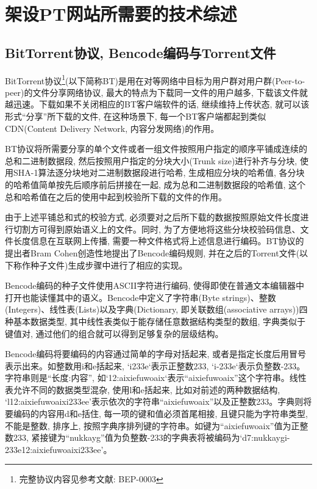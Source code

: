 \chapter{架设PT网站所需要的技术综述}

\section{BitTorrent协议, Bencode编码与Torrent文件}
\label{sec:BitorrentProtocol}

BitTorrent协议\footnote{完整协议内容见参考文献: BEP-0003\cite{bramcohen2008bep0003}}(以下简称BT)是用在对等网络中目标为用户群对用户群(Peer-to-peer)的文件分享网络协议, 最大的特点为下载同一文件的用户越多, 下载该文件就越迅速。下载如果不关闭相应的BT客户端软件的话, 继续维持上传状态, 就可以该形式``分享''所下载的文件, 在这种场景下, 每一个BT客户端都起到类似CDN(Content Delivery Network, 内容分发网络)的作用。

BT协议将所需要分享的单个文件或者一组文件按照用户指定的顺序平铺成连续的总和二进制数据段, 然后按照用户指定的分块大小(Trunk size)进行补齐与分块, 使用SHA-1算法逐分块地对二进制数据段进行哈希, 生成相应分块的哈希值, 各分块的哈希值简单按先后顺序前后拼接在一起, 成为总和二进制数据段的哈希值, 这个总和哈希值在之后的使用中起到校验所下载的文件的作用。

由于上述平铺总和式的校验方式, 必须要对之后所下载的数据按照原始文件长度进行切割方可得到原始语义上的文件。同时, 为了方便地将这些分块校验码信息、文件长度信息在互联网上传播, 需要一种文件格式将上述信息进行编码。BT协议的提出者Bram Cohen创造性地提出了Bencode编码规则, 并在之后的Torrent文件(以下称作种子文件)生成步骤中进行了相应的实现。

Bencode编码的种子文件使用ASCII字符进行编码, 使得即使在普通文本编辑器中打开也能读懂其中的语义。Bencode中定义了字符串(Byte strings)、整数(Integers)、线性表(Lists)以及字典(Dictionary, 即关联数组(associative arrays))四种基本数据类型, 其中线性表类似于能存储任意数据结构类型的数组, 字典类似于键值对, 通过他们的组合就可以得到足够复杂的层级结构。

Bencode编码将要编码的内容通过简单的字母对括起来\cite{wikieditors2019bencode}, 或者是指定长度后用冒号表示出来。如整数用i和e括起来, `i233e`表示正整数233, `i-233e`表示负整数-233。字符串则是``长度:内容'', 如`12:aixiefuwoaix`表示``aixiefuwoaix''这个字符串。线性表允许不同的数据类型混杂, 使用l和e括起来, 比如对前述的两种数据结构, `l12:aixiefuwoaixi\-233ee'表示依次的字符串``aixiefuwoaix''以及正整数233。字典则将要编码的内容用d和e括住, 每一项的键和值必须首尾相接, 且键只能为字符串类型, 不能是整数, 排序上, 按照字典序排列键的字符串。如键为``aixiefuwoaix''值为正整数233, 紧接键为``nukkayg''值为负整数-233的字典表将被编码为`d7:nukkaygi-233e12:aixiefuwoaixi233ee'。

